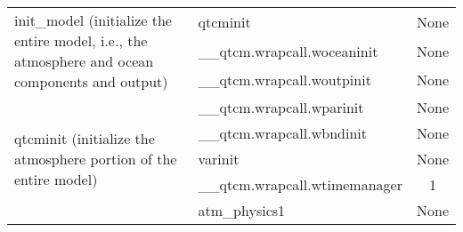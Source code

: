 \begin{longtable}{l|lc}
\hline
\multirow{3}{*}{\parbox{0.4\linewidth}{init\_model (initialize the entire model, i.e., the atmosphere and ocean components and output)}} & qtcminit & None \\
         & \_\_qtcm.wrapcall.woceaninit & None \\
         & \_\_qtcm.wrapcall.woutpinit & None \\
\hline
\multirow{5}{*}{\parbox{0.4\linewidth}{qtcminit (initialize the atmosphere portion of the entire model)}} & \_\_qtcm.wrapcall.wparinit & None \\
         & \_\_qtcm.wrapcall.wbndinit & None \\
         & varinit & None \\
         & \_\_qtcm.wrapcall.wtimemanager & 1\\
         & atm\_physics1 & None \\
\end{longtable}